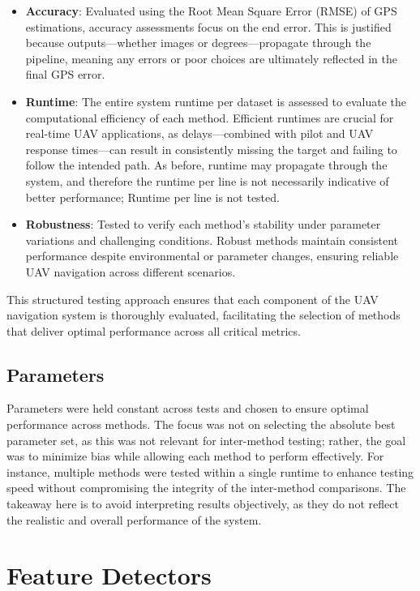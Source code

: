 \begin{itemize}
    \item \textbf{Accuracy}: Evaluated using the Root Mean Square Error (RMSE) of GPS estimations, accuracy assessments focus on the end error. This is justified because outputs—whether images or degrees—propagate through the pipeline, meaning any errors or poor choices are ultimately reflected in the final GPS error.
    \item \textbf{Runtime}: The entire system runtime per dataset is assessed to evaluate the computational efficiency of each method. Efficient runtimes are crucial for real-time UAV applications, as delays—combined with pilot and UAV response times—can result in consistently missing the target and failing to follow the intended path. As before, runtime may propagate through the system, and therefore the runtime per line is not necessarily indicative of better performance; Runtime per line is not tested. 
    \item \textbf{Robustness}: Tested to verify each method's stability under parameter variations and challenging conditions. Robust methods maintain consistent performance despite environmental or parameter changes, ensuring reliable UAV navigation across different scenarios.
\end{itemize}

This structured testing approach ensures that each component of the UAV navigation system is thoroughly evaluated, facilitating the selection of methods that deliver optimal performance across all critical metrics.

\subsection{Parameters}  
Parameters were held constant across tests and chosen to ensure optimal performance across methods. The focus was not on selecting the absolute best parameter set, as this was not relevant for inter-method testing; rather, the goal was to minimize bias while allowing each method to perform effectively. For instance, multiple methods were tested within a single runtime to enhance testing speed without compromising the integrity of the inter-method comparisons. The takeaway here is to avoid interpreting results objectively, as they do not reflect the realistic and overall performance of the system.



\section{Feature Detectors}

